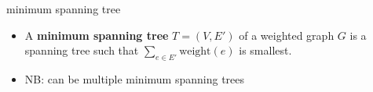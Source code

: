\begin{frame}{minimum spanning tree}
    \begin{itemize}
        \item A \textbf{minimum spanning tree} $T=(V, E')$ of a weighted graph $G$ is a spanning tree such that $\sum_{e\in E'} \text{weight}(e)$ is smallest.
        \item NB: can be multiple minimum spanning trees
    \end{itemize}
\end{frame}
